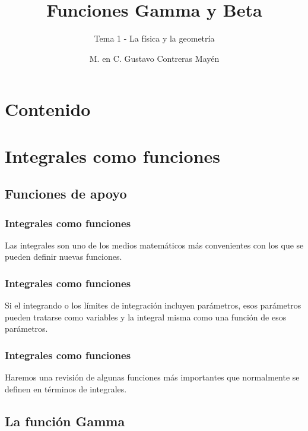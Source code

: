 \documentclass[12pt]{beamer}
\title{\large{Funciones Gamma y Beta}}
\subtitle{Tema 1 - La física y la geometría}
\author{M. en C. Gustavo Contreras Mayén}
\date{}
\begin{document}
\maketitle
\fontsize{14}{14}\selectfont
{}

\section*{Contenido}

\section{Integrales como funciones}
\subsection{Funciones de apoyo}

\begin{frame}
\frametitle{Integrales como funciones}
Las integrales son uno de los medios matemáticos más convenientes con los que se pueden definir nuevas funciones.
\end{frame}
\begin{frame}
\frametitle{Integrales como funciones}
Si el integrando o los límites de integración incluyen parámetros, esos parámetros pueden tratarse como variables y la integral misma como una función de esos parámetros.
\end{frame}
\begin{frame}
\frametitle{Integrales como funciones}
Haremos una revisión de algunas funciones más importantes que normalmente se definen en términos de integrales.
\end{frame}

\subsection*{La función Gamma}
\end{document}
